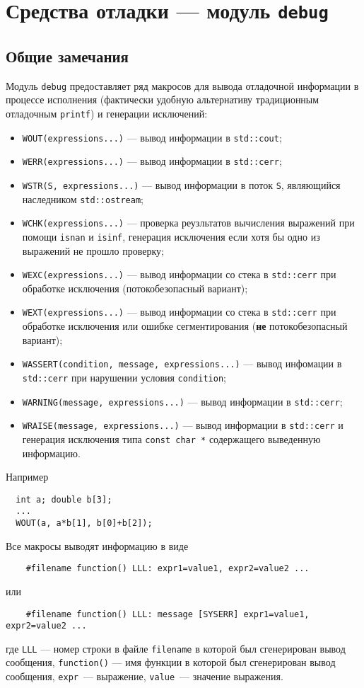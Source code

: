 \section{Средства отладки --- модуль {\tt debug}}
\subsection{Общие замечания}
Модуль \verb'debug' предоставляет ряд макросов для вывода отладочной информации в процессе исполнения
(фактически удобную альтернативу традиционным отладочным \verb'printf') и генерации исключений:
\begin{itemize}
  \item\verb'WOUT(expressions...)' --- вывод информации в \verb'std::cout';
  \item\verb'WERR(expressions...)' --- вывод информации в \verb'std::cerr';
  \item\verb'WSTR(S, expressions...)' --- вывод информации в поток \verb'S', являющийся наследником \verb'std::ostream';
  \item\verb'WCHK(expressions...)' --- проверка реузльтатов вычисления выражений при помощи \verb'isnan' и \verb'isinf',
    генерация исключения если хотя бы одно из выражений не прошло проверку;
  \item\verb'WEXC(expressions...)' --- вывод информации со стека в \verb'std::cerr' при обработке исключения (потокобезопасный вариант); 
  \item\verb'WEXT(expressions...)' --- вывод информации со стека в \verb'std::cerr' при обработке исключения или ошибке сегментирования
    ({\bf не} потокобезопасный вариант); 
  \item\verb'WASSERT(condition, message, expressions...)' --- вывод инфомации в \verb'std::cerr'
    при нарушении условия \verb'condition';
  \item\verb'WARNING(message, expressions...)' --- вывод информации в \verb'std::cerr';
  \item\verb'WRAISE(message, expressions...)' --- вывод информации в \verb'std::cerr'
    и генерация исключения типа \verb'const char *' содержащего выведенную информацию.
\end{itemize}
Например
\begin{verbatim}
  int a; double b[3];
  ...
  WOUT(a, a*b[1], b[0]+b[2]);
\end{verbatim}

Все макросы выводят информацию в виде
\begin{verbatim}
    #filename function() LLL: expr1=value1, expr2=value2 ...
\end{verbatim}
или
\begin{verbatim}
    #filename function() LLL: message [SYSERR] expr1=value1, expr2=value2 ...
\end{verbatim}
где \verb'LLL' --- номер строки в файле \verb'filename' в которой был сгенерирован вывод сообщения,
\verb'function()' --- имя функции в которой был сгенерирован вывод сообщения, \verb'expr'~--- выражение,
\verb'value'~--- значение выражения.

